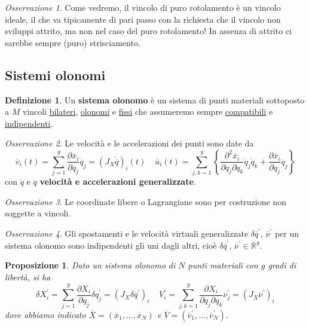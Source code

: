 \documentclass{book}
\theoremstyle{plain}
\theoremstyle{plain}
\theoremstyle{plain}
\theoremstyle{plain}
\theoremstyle{plain}
\newtheorem{prop}{Proposizione}[chapter]
\theoremstyle{definition}
\newtheorem{defi}{Definizione}[chapter]
\theoremstyle{remark}
\newtheorem*{oss}{Osservazione}
\theoremstyle{definition}
\begin{document}
\begin{oss}
    Come vedremo, il vincolo di puro rotolamento è un vincolo ideale, il che va tipicamente di pari passo con la richiesta che il vincolo non sviluppi attrito, ma non nel caso del puro rotolamento! In assenza di attrito ci sarebbe sempre (puro) strisciamento.
\end{oss}

\subsection{Sistemi olonomi}

\begin{defi}
    Un \textbf{sistema olonomo} è un sistema di punti materiali sottoposto a $M$ vincoli \underline{bilateri}, \underline{olonomi} e \underline{fissi} che assumeremo sempre \underline{compatibili} e \underline{indipendenti}.
\end{defi}

\begin{oss}
    Le velocità e le accelerazioni dei punti sono date da
    \begin{displaymath}
        \overline{v}_i(t) = \sum_{j=1}^{g}\frac{\partial \overline{x}_i}{\partial q_j}\dot{q}_j=\left(J_X\dot{\overline{q}}\right)_i(t) \ \ \ \ \ \overline{a}_i(t) = \sum_{j,k=1}^{g}\left\{\frac{\partial^2 \overline{x}_i}{\partial q_j\partial q_k}\dot{q}_j\dot{q}_k + \frac{\partial \overline{x}_i}{\partial q_j}\ddot{q}_j\right\}
    \end{displaymath}
    con $\dot{q}$ e $\ddot{q}$ \textbf{velocità e accelerazioni generalizzate}.
\end{oss}

\begin{oss}
    Le coordinate libere o Lagrangiane sono per costruzione non soggette a vincoli.
\end{oss}

\begin{oss}
    Gli spostamenti e le velocità virtuali generalizzate $\delta\overline{q}^{\prime}$, $\overline{\nu}^{\prime}$ per un sistema olonomo sono indipendenti gli uni dagli altri, cioè $\delta\overline{q}^{\prime}$, $\overline{\nu}^{\prime} \in \mathbb{R}^g$.
\end{oss}

\begin{prop}
    Dato un sistema olonomo di $N$ punti materiali con $g$ gradi di libertà, si ha
    \begin{displaymath}
        \delta X_i^{\prime} = \sum_{j=1}^{g}\frac{\partial X_i}{\partial q_j}\delta{q}_j^{\prime}=\left(J_X\delta\overline{q}^{\prime}\right)_i \ \ \ \ \ V_i^{\prime} = \sum_{j,k=1}^{g}\frac{\partial X_i}{\partial q_j\partial q_k}\nu_j^{\prime} =\left(J_X\overline{\nu}^{\prime}\right)_i
    \end{displaymath}
    dove abbiamo indicato $\overline{X}=\left(\overline{x}_1,\ldots,\overline{x}_N\right)$ e $\overline{V}=\left(\overline{v}_1^{\prime},\ldots,\overline{v}_N^{\prime}\right)$.
\end{prop}
\end{document}
